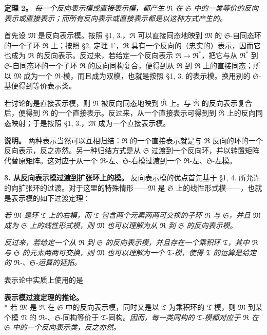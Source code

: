 \documentclass[11pt]{article}
\providecommand{\frR}{\mathfrak R}
\providecommand{\frS}{\mathfrak S}
\providecommand{\frT}{\mathfrak T}
\providecommand{\frM}{\mathfrak M}
\providecommand{\frN}{\mathfrak N}
\begin{document}
\noindent\textbf{定理 2。} \emph{每一个反向表示模或直接表示模，都产生 \(\frR\) 在 \(\frS\) 中的一类等价的反向表示或直接表示；而所有反向表示或直接表示都是以这种方式产生的。}

首先设 \(\frM\) 是反向表示模。按照 §1, 3.，\(\frR\) 可以直接同态地映到 \(\frM\) 的 \(\frS\)-自同态环的一个子环 \(\overline{\frR}\) 上；按照 §2, 定理 1'，\(\overline{\frR}\) 具有一个反向的（忠实的）表示，因而它也成为 \(\frR\) 的反向表示。反过来，若给定一个反向表示 \(\frR\to\frR^*\)，把它与从 \(\frR^*\) 到 \(\frS\)-自同态环的一个子环 \(\overline{\frR}\) 的反向同构复合，便得到从 \(\frR\) 到 \(\overline{\frR}\) 上的直接同态；所以 \(\frM\) 成为一个 \(\frR\)-模，而且成为双模，也就是按照 §1, 3. 的表示模。换用别的 \(\frS\)-基便得到等价表示类。

若讨论的是直接表示模，则 \(\frR\) 被反向同态地映到 \(\overline{\frR}\) 上。与 \(\overline{\frR}\) 的反向表示复合后，便得到 \(\frR\) 的一个直接表示。反过来，从一个直接表示可得到到 \(\overline{\frR}\) 上的反向同态映射；于是按照 §1, 3.，\(\frM\) 成为一个直接表示模。

\noindent\textbf{说明。} 两种表示当然可以互相归结：\(\frR\) 的一个直接表示就是与 \(\frR\) 反向的环的一个反向表示，反之亦然。另一种归结方式是从 \(\frS\) 过渡到一个反向环，并以转置矩阵代替原矩阵。这对应于从一个 \(\frR\)-左、\(\frS\)-右模过渡到一个 \(\frR\)-左、\(\frS\)-左模。

\noindent\textbf{3. 从反向表示模过渡到扩张环上的模。} 反向表示模的优点首先基于 §1, 4. 所允许的向扩张环的过渡。对于这里的特殊情形——\(\frM\) 是 \(\frS\) 上的线性形式模——，也就是表示模的如下过渡定理：

\emph{若 \(\frM\) 是环 \(\frT\) 上的右模，而 \(\frT\) 包含两个元素两两可交换的子环 \(\frR\) 与 \(\frS\)，并且 \(\frM\) 成为 \(\frS\) 上的线性形式模，则 \(\frM\) 也可以理解为从 \(\frR\) 到 \(\frS\) 的反向表示模。}

\emph{反过来，若给定一个从 \(\frR\) 到 \(\frS\) 的反向表示模，并且存在一个乘积环 \(\frT\)，其中 \(\frR\) 与 \(\frS\) 的元素两两可交换，则 \(\frM\) 也可以理解为一个 \(\frT\)-模，使得 \(\frT\) 的运算是给定的 \(\frR\)-、\(\frS\)-运算的延拓。}

表示论中实质上使用的是

\noindent\textbf{表示模过渡定理的推论。}\\*
若 \(\frM\) 是 \(\frR\) 在 \(\frS\) 中的反向表示模，同时又是以 \(\frT\) 为乘积环的 \(\frT\)-模，则 \(\frM\) 到某个模 \(\frN\) 的 \(\frR\)-、\(\frS\)-同构等价于 \(\frT\)-同构。\emph{因而，每一类同构的 \(\frT\)-模都对应于 \(\frR\) 在 \(\frS\) 中的一个反向表示类，反之亦然。}
\end{document}
